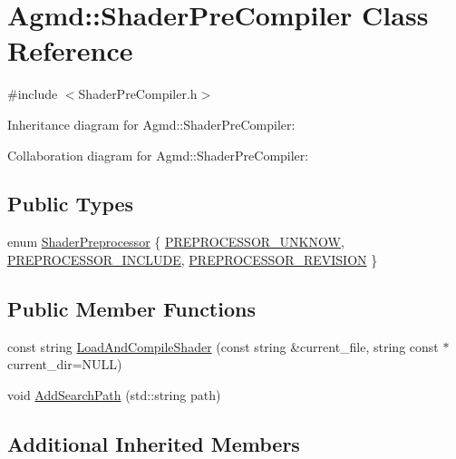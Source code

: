 \hypertarget{class_agmd_1_1_shader_pre_compiler}{\section{Agmd\+:\+:Shader\+Pre\+Compiler Class Reference}
\label{class_agmd_1_1_shader_pre_compiler}
}


{\ttfamily \#include $<$Shader\+Pre\+Compiler.\+h$>$}



Inheritance diagram for Agmd\+:\+:Shader\+Pre\+Compiler\+:


Collaboration diagram for Agmd\+:\+:Shader\+Pre\+Compiler\+:
\subsection*{Public Types}
\begin{DoxyCompactItemize}
\item 
enum \hyperlink{class_agmd_1_1_shader_pre_compiler_aa972735de2129e4ea164dbb29d8ce83f}{Shader\+Preprocessor} \{ \hyperlink{class_agmd_1_1_shader_pre_compiler_aa972735de2129e4ea164dbb29d8ce83fab5dcfdc2401dfbd525c902480b57acda}{P\+R\+E\+P\+R\+O\+C\+E\+S\+S\+O\+R\+\_\+\+U\+N\+K\+N\+O\+W}, 
\hyperlink{class_agmd_1_1_shader_pre_compiler_aa972735de2129e4ea164dbb29d8ce83fa18d8e65d5c63780db20407171ba8a186}{P\+R\+E\+P\+R\+O\+C\+E\+S\+S\+O\+R\+\_\+\+I\+N\+C\+L\+U\+D\+E}, 
\hyperlink{class_agmd_1_1_shader_pre_compiler_aa972735de2129e4ea164dbb29d8ce83faab7fc29129348d51ad1bd64e8250499a}{P\+R\+E\+P\+R\+O\+C\+E\+S\+S\+O\+R\+\_\+\+R\+E\+V\+I\+S\+I\+O\+N}
 \}
\end{DoxyCompactItemize}
\subsection*{Public Member Functions}
\begin{DoxyCompactItemize}
\item 
const string \hyperlink{class_agmd_1_1_shader_pre_compiler_a1b4b729ae9c7aa921d0871d40baaad68}{Load\+And\+Compile\+Shader} (const string \&current\+\_\+file, string const $\ast$current\+\_\+dir=N\+U\+L\+L)
\item 
void \hyperlink{class_agmd_1_1_shader_pre_compiler_adaf0f7c1f7c232cb4f10fd3290ff63be}{Add\+Search\+Path} (std\+::string path)
\end{DoxyCompactItemize}
\subsection*{Additional Inherited Members}


